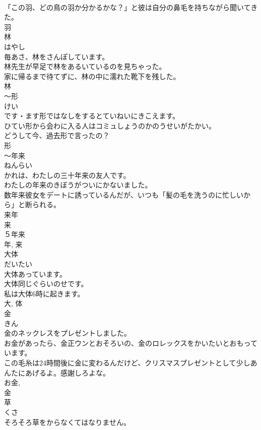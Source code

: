 \documentclass[8pt]{extreport}
\begin{document}
\begin{CJK}{UTF8}{min}
\\	「この羽、どの鳥の羽か分かるかな？」と彼は自分の鼻毛を持ちながら聞いてきた。	
\\	羽	
\\	林	
\\	はやし	
\\	毎あさ、林をさんぽしています。	
\\	林先生が早足で林をあるいているのを見ちゃった。	
\\	家に帰るまで待てずに、林の中に濡れた靴下を残した。	
\\	林	
\\	〜形	
\\	けい	
\\	です・ます形ではなしをするとていねいにきこえます。	
\\	ひてい形から会わに入る人はコミュしょうのかのうせいがたかい。	
\\	どうして今、過去形で言ったの？	
\\	形	
\\	〜年来	
\\	ねんらい	
\\	かれは、わたしの三十年来の友人です。	
\\	わたしの年来のきぼうがついにかないました。	
\\	数年来彼女をデートに誘っているんだが、いつも「髪の毛を洗うのに忙しいから」と断られる。	
\\	来年 
\\	来 
\\	５年来 
\\	年, 来	
\\	大体	
\\	だいたい	
\\	大体あっています。	
\\	大体同じぐらいのせです。	
\\	私は大体6時に起きます。	
\\	大, 体	
\\	金	
\\	きん	
\\	金のネックレスをプレゼントしました。	
\\	お金があったら、金正ウンとおそろいの、金のロレックスをかいたいとおもっています。	
\\	この毛糸は24時間後に金に変わるんだけど、クリスマスプレゼントとして少しあんたにあげるよ。感謝しろよな。	
\\	お金, 
\\	金	
\\	草	
\\	くさ	
\\	そろそろ草をからなくてはなりません。	

\end{CJK}
\end{document}
